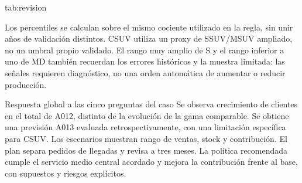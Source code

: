 {tab:revision}{}

Los percentiles se calculan sobre el mismo cociente utilizado en la regla, sin
unir años de validación distintos. CSUV utiliza un proxy de SSUV/MSUV ampliado,
no un umbral propio validado. El rango muy amplio de S y el rango inferior a uno
de MD también recuerdan los errores históricos y la muestra limitada: las señales
requieren diagnóstico, no una orden automática de aumentar o reducir producción.

\begin{idea}{Respuesta global a las cinco preguntas del caso}
Se observa crecimiento de clientes en el total de A012, distinto de la evolución
de la gama comparable. Se obtiene una previsión A013 evaluada retrospectivamente,
con una limitación específica para CSUV. Los escenarios muestran rango de ventas,
stock y contribución. El plan separa pedidos de llegadas y revisa a tres meses.
La política recomendada cumple el servicio medio central acordado y mejora la
contribución frente al base, con supuestos y riesgos explícitos.
\end{idea}
\FloatBarrier
